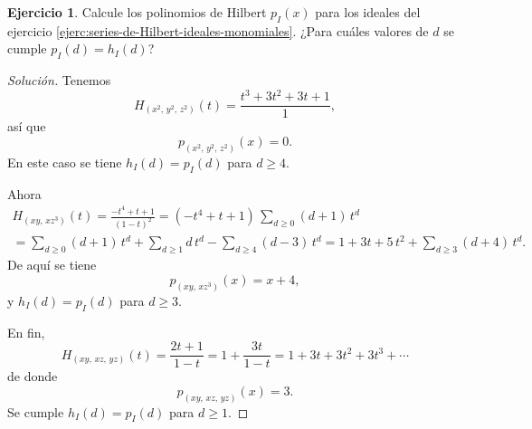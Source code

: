 \documentclass{article}
\theoremstyle{definition}
\newtheorem{ejerc}{Ejercicio}
\newenvironment{solucion}{\begin{proof}[Solución]}{\end{proof}}
\begin{document}
\begin{ejerc}
  Calcule los polinomios de Hilbert $p_I (x)$ para los ideales del ejercicio
  \ref{ejerc:series-de-Hilbert-ideales-monomiales}. ¿Para cuáles valores de $d$
  se cumple $p_I (d) = h_I (d)$?

  \ifdefined\solutions\begin{solucion}
    Tenemos
    $$H_{(x^2, \, y^2, \, z^2)} (t) = \frac{t^3 + 3 t^2 + 3 t + 1}{1},$$
    así que
    $$p_{(x^2, \, y^2, \, z^2)} (x) = 0.$$
    En este caso se tiene $h_I (d) = p_I (d)$ para $d \ge 4$.

    Ahora
    \begin{multline*}
      H_{(xy, \, xz^3)} (t) =
      \frac{-t^4 + t + 1}{(1-t)^2} =
      (-t^4 + t + 1)\,\sum_{d\ge 0} (d+1)\,t^d \\
    = \sum_{d\ge 0} (d+1)\,t^d + \sum_{d\ge 1} d\,t^d - \sum_{d\ge 4} (d-3)\,t^d =
      1 + 3t + 5\,t^2 + \sum_{d\ge 3} (d+4)\,t^d.
    \end{multline*}
    De aquí se tiene
    $$p_{(xy, \, xz^3)} (x) = x+4,$$
    y $h_I (d) = p_I (d)$ para $d \ge 3$.

    En fin,
    \[ H_{(xy, \, xz, \, yz)} (t) =
       \frac{2t + 1}{1-t} =
       1 + \frac{3t}{1-t} =
       1 + 3t + 3t^2 + 3t^3 + \cdots \]
    de donde
    $$p_{(xy, \, xz, \, yz)} (x) = 3.$$
    Se cumple $h_I (d) = p_I (d)$ para $d \ge 1$.
  \end{solucion}\fi
\end{ejerc}
\end{document}
